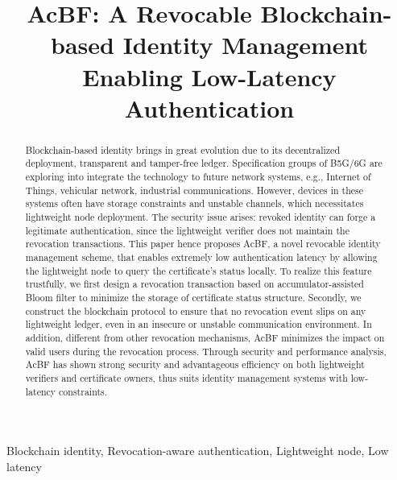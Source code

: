 \documentclass[conference]{IEEEtran}
\title{AcBF: A Revocable Blockchain-based Identity Management Enabling Low-Latency Authentication}
\begin{document}
\maketitle

\begin{abstract}
	Blockchain-based identity brings in great evolution due to its decentralized deployment, transparent and tamper-free ledger. Specification groups of B5G/6G are exploring into integrate the technology to future network systems, e.g., Internet of Things, vehicular network, industrial communications. However, devices in these systems often have storage constraints and unstable channels,  which necessitates lightweight node deployment. The security issue arises: revoked identity can forge a legitimate authentication, since the lightweight verifier does not maintain the revocation transactions. 
	This paper hence proposes AcBF, a novel revocable identity management scheme, that enables extremely low authentication latency by allowing the lightweight node to query the certificate's status locally. To realize this feature trustfully, we first design a revocation transaction based on accumulator-assisted Bloom filter to minimize the storage of certificate status structure. Secondly, we construct the blockchain protocol to ensure that no revocation event slips on any lightweight ledger, even in an insecure or unstable communication environment.  
	In addition, different from other revocation mechanisms, AcBF minimizes the impact on valid users during the revocation process. %
	Through security and performance analysis, AcBF has shown strong security and advantageous efficiency on both lightweight verifiers and certificate owners, thus suits identity management systems with low-latency constraints.
\end{abstract}
\begin{IEEEkeywords}
    Blockchain identity, Revocation-aware authentication, Lightweight node, Low latency
\end{IEEEkeywords}
\end{document}
